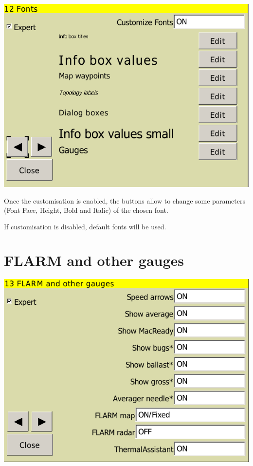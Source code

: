 \documentclass[a4paper,12pt]{refrep}
\begin{document}
\begin{center}
\includegraphics[angle=0,width=\linewidth,keepaspectratio='true']{figures/config-fonts.png}
\end{center}

Once the customisation is enabled, the  buttons allow to change some parameters (Font Face, Height, Bold and Italic) of the chosen font.

If customisation is disabled, default fonts will be used.

\clearpage
\section{FLARM and other gauges}\label{sec:vario-gauge}

\begin{center}
\includegraphics[angle=0,width=\linewidth,keepaspectratio='true']{figures/config-10.png}
\end{center}
\end{document}
